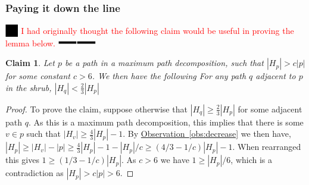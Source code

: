 \documentclass[11pt]{article}
\newtheorem{claim}[theorem]{Claim}
\theoremstyle{definition}
\newcommand{\Obs}[1]{\hyperref[obs:#1]{Observation~\ref*{obs:#1}}} %
\newcommand{\XSays}[2]{{
      {$\rule[-0.12cm]{0.2in}{0.5cm}$\fbox{\tt
            #1:} }
      \textcolor{red}{#2}
      \marginpar{\textcolor{blue}{#1}}
      {$\rule[0.1cm]{0.3in}{0.1cm}$\fbox{\tt
            end}$\rule[0.1cm]{0.3in}{0.1cm}$}
      }
   }
\newcommand{\Ben}[1]{{\XSays{Ben}{#1}}}
\begin{document}
\subsubsection{Paying it down the line}

%   

\Ben{I had originally thought the following claim would be useful in proving the lemma below.}
\begin{claim}
\label{clm:sizes}
 Let $p$ be a path in a maximum path decomposition, such that $|H_p|>c|p|$ for some constant $c> 6$.
 We then have the following
  For any path $q$ adjacent to $p$ in the shrub, $|H_q|<\frac{2}{3}|H_p|$
\end{claim}
\begin{proof}
  To prove the claim, suppose otherwise that $|H_q|\geq \frac{2}{3}|H_p|$ for some 
  adjacent path $q$.  As this is a maximum path decomposition, this implies that there is some 
  $v\in p$ such that $|H_v|\geq \frac{4}{3}|H_p|-1$.
  By \Obs{decrease} we then have, 
   $|H_p| \geq |H_v| - |p|\geq \frac{4}{3}|H_p| - 1 - |H_p|/c \geq (4/3-1/c)|H_p|-1$.
  When rearranged this gives $1\geq (1/3-1/c)|H_p|$.  As $c>6$ we have $1\geq |H_p|/6$, 
  which is a contradiction as $|H_p|>c|p|>6$.  
\end{proof}
\end{document}
